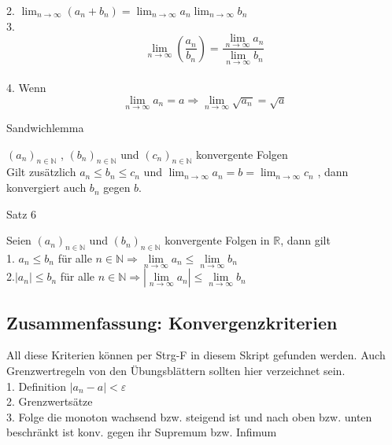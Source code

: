 \documentclass[smallheadings,headsepline,12pt,a4paper]{scrartcl}
\begin{document}
2. $\lim_{n \rightarrow \infty} (a_n + b_n) = \lim_{n \rightarrow \infty} a_n \lim_{n \rightarrow \infty} b_n $ \\

3. $$ \lim_{n \rightarrow \infty} ( \frac{a_n}{b_n}) = \frac{\lim_{n \rightarrow \infty} a_n}{\lim_{n \rightarrow \infty} b_n}$$ \\

4. Wenn $$\lim\limits_{n \rightarrow \infty} a_n = a \Rightarrow \lim\limits_{n \rightarrow \infty} \sqrt{a_n} = \sqrt{a} $$

\item[Sandwichlemma]

$(a_n)_{n\in \mathbb{N}}$ , $(b_n)_{n\in \mathbb{N}}$ und $(c_n)_{n\in \mathbb{N}}$ konvergente Folgen \\
Gilt zusätzlich $ a_n \leq b_n \leq c_n $ und $\lim_{n \rightarrow \infty} a_n = b = \lim_{n \rightarrow \infty} c_n $ , dann konvergiert auch 
$b_n$ gegen $b$. \\

\item[Satz 6]

Seien $(a_n)_{n\in \mathbb{N}}$ und $(b_n)_{n\in \mathbb{N}}$ konvergente Folgen in $\mathbb{R}$, dann gilt \\

1. $a_n \leq b_n $ für alle $ n \in \mathbb{N} \Rightarrow \lim\limits_{n \rightarrow \infty} a_n \leq \lim\limits_{n \rightarrow \infty} b_n $ \\

2.$|a_n| \leq b_n $ für alle $ n \in \mathbb{N} \Rightarrow |\lim\limits_{n \rightarrow \infty} a_n | \leq \lim\limits_{n \rightarrow \infty} b_n $ \\

\newpage

\subsection*{Zusammenfassung: Konvergenzkriterien}

All diese Kriterien können per Strg-F in diesem Skript gefunden werden. Auch Grenzwertregeln von den Übungsblättern sollten hier verzeichnet sein.\\

1. Definition $|a_n-a|<\varepsilon$ \\
2. Grenzwertsätze \\
3. Folge die monoton wachsend bzw. steigend ist und nach oben bzw. unten beschränkt ist konv. gegen ihr Supremum bzw. Infimum \\
\end{document}
